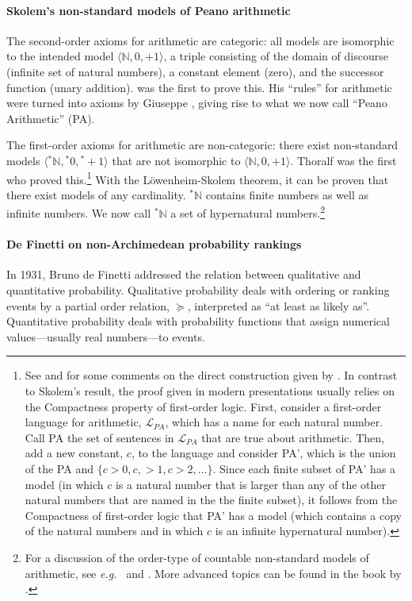 \paragraph{Skolem's non-standard models of Peano arithmetic}\label{sec:skolem}
The second-order axioms for arithmetic are categoric: all models are isomorphic to the intended model $\langle \mathbb{N},0,+1 \rangle$, a triple consisting of the domain of discourse (infinite set of natural numbers), a constant element (zero), and the successor function (unary addition).
\citet{Dedekind:1888} was the first to prove this. His ``rules'' for arithmetic were turned into axioms by Giuseppe \citet{Peano:1889}, giving rise to what we now call ``Peano Arithmetic'' (PA).

The first-order axioms for arithmetic are non-categoric: there exist non-standard models $\langle {^\ast\mathbb{N}},{^\ast0},{^\ast+}{1} \rangle$ that are not isomorphic to $\langle \mathbb{N},0,+1 \rangle$. Thoralf \citet{Skolem:1934} was the first who proved this.\footnote{See \citet[section~3]{Stillwell:1977} and \citet[section~3.2]{Kanovei_etal:2013} for some comments on the direct construction given by \citet{Skolem:1934}. In contrast to Skolem's result, the proof given in modern presentations usually relies on the Compactness property of first-order logic. First, consider a first-order language for arithmetic, $\mathcal{L}_{PA}$, which has a name for each natural number. Call PA the set of sentences in $\mathcal{L}_{PA}$ that are true about arithmetic. Then, add a new constant, $c$, to the language and consider PA', which is the union of the PA and $\{c>0,c,>1,c>2, \ldots\}$. Since each finite subset of PA' has a model (in which $c$ is a natural number that is larger than any of the other natural numbers that are named in the the finite subset), it follows from the Compactness of first-order logic that PA' has a model (which contains a copy of the natural numbers and in which $c$ is an infinite hypernatural number).\label{fn:Skolem}} With the L\"{o}wenheim-Skolem theorem, it can be proven that there exist models of any cardinality. ${^\ast\mathbb{N}}$ contains finite numbers as well as infinite numbers. We now call ${^\ast\mathbb{N}}$ a set of hypernatural numbers.\footnote{For a discussion of the order-type of countable non-standard models of arithmetic, see \textit{e.g.}\ \citet[Ch.~25, p.~302--318]{Boolos_etal:2007} and \citet{McGee:2002}. More advanced topics can be found in the book by \citet{KossakSchmerl:2006}.}

\paragraph{De Finetti on non-Archimedean probability rankings\label{sec:dF}}
In 1931, Bru\-no de Finetti addressed the relation between qualitative and quantitative probability. Qualitative probability deals with ordering or ranking events by a partial order relation, $\succeq$, interpreted as ``at least as likely as''. Quantitative probability deals with probability functions that assign numerical values---usually real numbers---to events.

